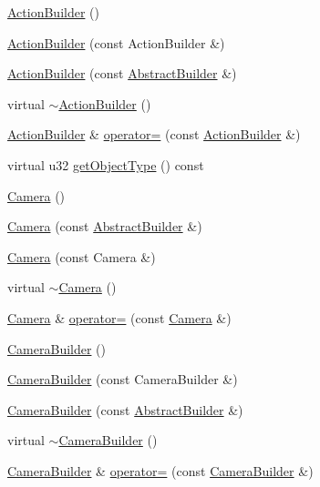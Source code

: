 \begin{DoxyCompactItemize}
\hyperlink{namespacejli_add5250909a3a5a38d28295b426e43da7}{Action\+Builder} ()
\item 
\hyperlink{namespacejli_a96508fbaf421e7088d0213d649abf7ba}{Action\+Builder} (const Action\+Builder \&)
\item 
\hyperlink{namespacejli_ab6f83e83f1cecc616fbcc6dab3d26954}{Action\+Builder} (const \hyperlink{classjli_1_1_abstract_builder}{Abstract\+Builder} \&)
\item 
virtual \hyperlink{namespacejli_ab2e77266449aea2fbf9db5435931dc84}{$\sim$\+Action\+Builder} ()
\item 
\hyperlink{namespacejli_add5250909a3a5a38d28295b426e43da7}{Action\+Builder} \& \hyperlink{namespacejli_a52eac4944ed6adea3292bb7646e89bb1}{operator=} (const \hyperlink{namespacejli_add5250909a3a5a38d28295b426e43da7}{Action\+Builder} \&)
\item 
virtual u32 \hyperlink{namespacejli_ad74268a8f5493ee3df657a346cd64d30}{get\+Object\+Type} () const 
\item 
\hyperlink{namespacejli_ad3d15c9bf468345cc46e47bf7dd7d3e3}{Camera} ()
\item 
\hyperlink{namespacejli_a97fa95992b76788ae3feb7c62ddd6168}{Camera} (const \hyperlink{classjli_1_1_abstract_builder}{Abstract\+Builder} \&)
\item 
\hyperlink{namespacejli_a987bfeb3ffde7a3a032e131c6c356c53}{Camera} (const Camera \&)
\item 
virtual \hyperlink{namespacejli_a9407d365ccc6d206674e5a5869758943}{$\sim$\+Camera} ()
\item 
\hyperlink{namespacejli_ad3d15c9bf468345cc46e47bf7dd7d3e3}{Camera} \& \hyperlink{namespacejli_ae0ca0605362d0f66744c6b8c44e73adb}{operator=} (const \hyperlink{namespacejli_ad3d15c9bf468345cc46e47bf7dd7d3e3}{Camera} \&)
\item 
\hyperlink{namespacejli_ac774207b2ca46f60adc7d58d5252ebec}{Camera\+Builder} ()
\item 
\hyperlink{namespacejli_a8fe2558f8fe1d572700b414f9c0ccdf0}{Camera\+Builder} (const Camera\+Builder \&)
\item 
\hyperlink{namespacejli_a2dd10cbeedd42092b35159fd713834f3}{Camera\+Builder} (const \hyperlink{classjli_1_1_abstract_builder}{Abstract\+Builder} \&)
\item 
virtual \hyperlink{namespacejli_af4eb98dba938417574ac1607e82a5da6}{$\sim$\+Camera\+Builder} ()
\item 
\hyperlink{namespacejli_ac774207b2ca46f60adc7d58d5252ebec}{Camera\+Builder} \& \hyperlink{namespacejli_a75dbc7e82adc58eea850e84fbc0db767}{operator=} (const \hyperlink{namespacejli_ac774207b2ca46f60adc7d58d5252ebec}{Camera\+Builder} \&)

\end{DoxyCompactItemize}
